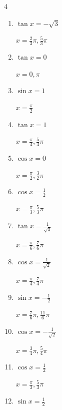\begin{multicols}{4}
\begin{enumerate}
  \item $\displaystyle \tan{x}  = -\sqrt{3}$

        $\displaystyle x = \frac{2}{3}\pi , \frac{5}{3}\pi$

  \item $\displaystyle \tan{x}  = 0$

        $\displaystyle x = 0 , \pi$

  \item $\displaystyle \sin{x}  = 1$

        $\displaystyle x = \frac{\pi}{2}$

  \item $\displaystyle \tan{x}  = 1$

        $\displaystyle x = \frac{\pi}{4} , \frac{5}{4}\pi$

  \item $\displaystyle \cos{x}  = 0$

        $\displaystyle x = \frac{\pi}{2} , \frac{3}{2}\pi$

  \item $\displaystyle \cos{x}  = \frac{1}{2}$

        $\displaystyle x = \frac{\pi}{3} , \frac{5}{3}\pi$

  \item $\displaystyle \tan{x}  = \frac{1}{\sqrt{3}}$

        $\displaystyle x = \frac{\pi}{6} , \frac{7}{6}\pi$

\columnbreak %

\resetques

  \item $\displaystyle \cos{x}  = \frac{1}{\sqrt{2}}$

        $\displaystyle x = \frac{\pi}{4} , \frac{7}{4}\pi$

  \item $\displaystyle \sin{x}  = -\frac{1}{2}$

        $\displaystyle x = \frac{7}{6}\pi , \frac{11}{6}\pi$

  \item $\displaystyle \cos{x}  = -\frac{1}{\sqrt{2}}$

        $\displaystyle x = \frac{3}{4}\pi , \frac{5}{4}\pi$

  \item $\displaystyle \cos{x}  = \frac{1}{2}$

        $\displaystyle x = \frac{\pi}{3} , \frac{5}{3}\pi$

  \item $\displaystyle \sin{x}  = \frac{1}{2}$


\end{enumerate}
\end{multicols}
